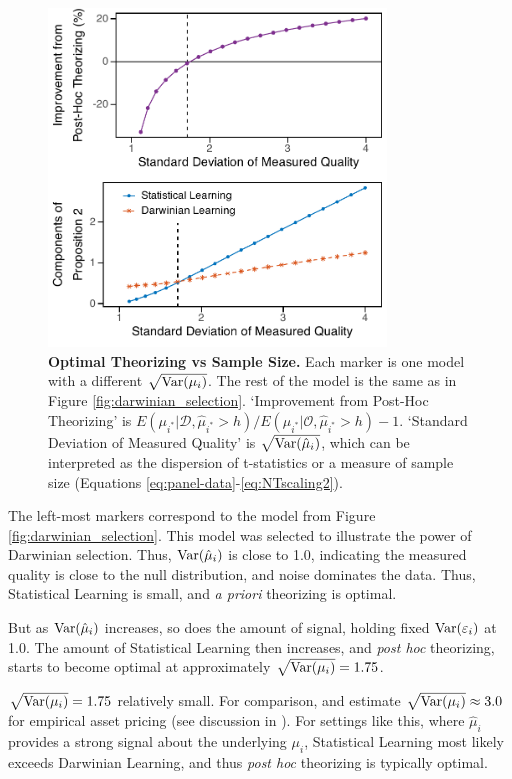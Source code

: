\documentclass[12pt,english]{article}
\theoremstyle{plain}
\theoremstyle{plain}
\begin{document}
\begin{figure}
    \centering
    \includegraphics[width=0.8\textwidth]{many-sd_muhat.pdf}
    \caption{\textbf{Optimal Theorizing vs Sample Size.} Each marker is one model with a different $\sqrt{\text{Var}(\mu_i)}$. The rest of the model is the same as in Figure \ref{fig:darwinian_selection}. `Improvement from Post-Hoc Theorizing' is $E\left(\mu_{i^{\ast}}|\mathcal{D}, \hat{\mu}_{i^{\ast}}>h\right)/E\left(\mu_{i^{\ast}}|\mathcal{O}, \hat{\mu}_{i^{\ast}}>h\right)-1$. `Standard Deviation of Measured Quality' is $\sqrt{\text{Var}(\hat{\mu}_i)}$, which can be interpreted as the dispersion of t-statistics or a measure of sample size (Equations \eqref{eq:panel-data}-\eqref{eq:NTscaling2}).}
    \label{fig:prop2-bigdata}
\end{figure}

The left-most markers correspond to the model from Figure \ref{fig:darwinian_selection}. This model was selected to illustrate the power of Darwinian selection. Thus, $\text{Var}(\hat{\mu}_i)$ is close to 1.0, indicating the measured quality is close to the null distribution, and noise dominates the data. Thus, Statistical Learning is small, and \emph{a priori} theorizing is optimal.

But as $\text{Var}(\hat{\mu}_i)$ increases, so does the amount of signal, holding fixed $\text{Var}(\varepsilon_i)$ at 1.0. The amount of Statistical Learning then increases, and \emph{post hoc} theorizing, starts to become optimal at approximately $\sqrt{\text{Var}(\mu_i)}=1.75$. 

$\sqrt{\text{Var}(\mu_i)}=1.75$ relatively small. For comparison, \citet{chen2020publication} and \citet{jensen2023there} estimate $\sqrt{\text{Var}(\mu_i)}\approx 3.0$ for empirical asset pricing (see discussion in \citealt{chen2022publication}). For settings like this, where $\hat{\mu}_i$ provides a strong signal about the underlying $\mu_i$, Statistical Learning most likely exceeds Darwinian Learning, and thus \emph{post hoc} theorizing is typically optimal.
\end{document}
